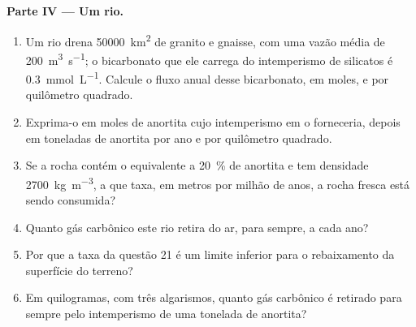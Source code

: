 \begin{problem}
\medskip
\noindent\textbf{Parte IV --- Um rio.}
\begin{enumerate}[resume]
  \item Um rio drena \qty{50000}{km^2} de granito e gnaisse, com uma vazão média de \qty{200}{m^3.s^{-1}}; o bicarbonato que ele carrega do intemperismo de silicatos é \qty{0.3}{mmol.L^{-1}}. Calcule o fluxo anual desse bicarbonato, em moles, e por quilômetro quadrado.
  \item Exprima-o em moles de anortita cujo intemperismo em  o forneceria, depois em toneladas de anortita por ano e por quilômetro quadrado.
  \item Se a rocha contém o equivalente a \qty{20}{\percent} de anortita e tem densidade \qty{2700}{kg.m^{-3}}, a que taxa, em metros por milhão de anos, a rocha fresca está sendo consumida?
  \item Quanto gás carbônico este rio retira do ar, para sempre, a cada ano?
  \item Por que a taxa da questão 21 é um limite inferior para o rebaixamento da superfície do terreno?
  \item Em quilogramas, com três algarismos, quanto gás carbônico é retirado para sempre pelo intemperismo de uma tonelada de anortita?
\end{enumerate}
\end{problem}
